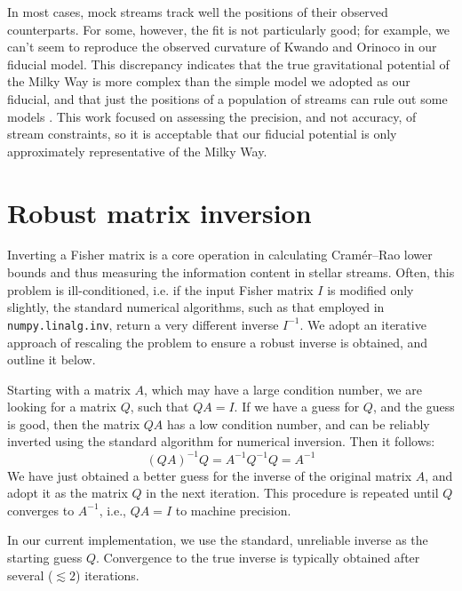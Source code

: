 \documentclass[modern]{aastex62}
\begin{document}
In most cases, mock streams track well the positions of their observed counterparts.
For some, however, the fit is not particularly good; for example, we can't seem to reproduce the observed curvature of Kwando and Orinoco in our fiducial model.
This discrepancy indicates that the true gravitational potential of the Milky Way is more complex than the simple model we adopted as our fiducial, and that just the positions of a population of streams can rule out some models \citep[cf.][]{pearson2015}.
This work focused on assessing the precision, and not accuracy, of stream constraints, so it is acceptable that our fiducial potential is only approximately representative of the Milky Way.

\section{Robust matrix inversion}
\label{sec:inversion}
Inverting a Fisher matrix is a core operation in calculating Cram\' er--Rao lower bounds and thus measuring the information content in stellar streams. 
Often, this problem is ill-conditioned, i.e. if the input Fisher matrix $I$ is modified only slightly, the standard numerical algorithms, such as that employed in \texttt{numpy.linalg.inv}, return a very different inverse $I^{-1}$.
We adopt an iterative approach of rescaling the problem to ensure a robust inverse is obtained, and outline it below.

Starting with a matrix $A$, which may have a large condition number, we are looking for a matrix $Q$, such that $Q A = I$.
If we have a guess for $Q$, and the guess is good, then the matrix $QA$ has a low condition number, and can be reliably inverted using the standard algorithm for numerical inversion.
Then it follows:
\begin{equation*}
(QA)^{-1} Q = A^{-1} Q^{-1} Q = A^{-1}
\end{equation*}
We have just obtained a better guess for the inverse of the original matrix $A$, and adopt it as the matrix $Q$ in the next iteration.
This procedure is repeated until $Q$ converges to $A^{-1}$, i.e., $Q A = I$ to machine precision.

In our current implementation, we use the standard, unreliable inverse as the starting guess $Q$. 
Convergence to the true inverse is typically obtained after several ($\lesssim2$) iterations.
\end{document}
